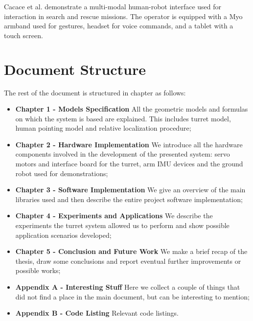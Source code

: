 Cacace et al. \cite{Cacace2016} demonstrate a multi-modal human-robot interface used for interaction in search and rescue missions. The operator is equipped with a Myo armband used for gestures, headset for voice commands, and a tablet with a touch screen.

\section*{Document Structure}
The rest of the document is structured in chapter as follows:
\begin{itemize}
    \item \textbf{Chapter 1 - Models Specification}  All the geometric models and formulas on which the system is based are explained. This includes turret model, human pointing model and relative localization procedure;
    \item \textbf{Chapter 2 - Hardware Implementation}  We introduce all the hardware components involved in the development of the presented system: servo motors and interface board for the turret, arm IMU devices and the ground robot used for demonstrations;
    \item \textbf{Chapter 3 - Software Implementation} We give an overview of the main libraries used and then describe the entire project software implementation;
    \item \textbf{Chapter 4 - Experiments and Applications} We describe the experiments the turret system allowed us to perform and show possible application scenarios developed;
    \item \textbf{Chapter 5 - Conclusion and Future Work} We make a brief recap of the thesis, draw some conclusions and report eventual further improvements or possible works;
    \item \textbf{Appendix A - Interesting Stuff} Here we collect a couple of things that did not find a place in the main document, but can be interesting to mention;
    \item \textbf{Appendix B - Code Listing} Relevant code listings.
\end{itemize}
